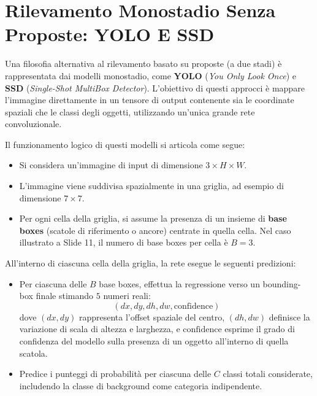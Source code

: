 ﻿\documentclass[11pt, a4paper]{article}
\begin{document}

\newpage

\section{Rilevamento Monostadio Senza Proposte: YOLO E SSD}

Una filosofia alternativa al rilevamento basato su proposte (a due stadi) è rappresentata dai modelli monostadio, come \textbf{YOLO} (\emph{You Only Look Once}) e \textbf{SSD} (\emph{Single-Shot MultiBox Detector}). L'obiettivo di questi approcci è mappare l'immagine direttamente in un tensore di output contenente sia le coordinate spaziali che le classi degli oggetti, utilizzando un'unica grande rete convoluzionale.

Il funzionamento logico di questi modelli si articola come segue:
\begin{itemize}
    \item Si considera un'immagine di input di dimensione $3 \times H \times W$.
    \item L'immagine viene suddivisa spazialmente in una griglia, ad esempio di dimensione $7 \times 7$.
    \item Per ogni cella della griglia, si assume la presenza di un insieme di \textbf{base boxes} (scatole di riferimento o ancore) centrate in quella cella. Nel caso illustrato a Slide 11, il numero di base boxes per cella è $B = 3$.
\end{itemize}

All'interno di ciascuna cella della griglia, la rete esegue le seguenti predizioni:
\begin{itemize}
    \item Per ciascuna delle $B$ base boxes, effettua la regressione verso un bounding-box finale stimando $5$ numeri reali:
    \[
    (dx, dy, dh, dw, \text{confidence})
    \]
    dove $(dx, dy)$ rappresenta l'offset spaziale del centro, $(dh, dw)$ definisce la variazione di scala di altezza e larghezza, e $\text{confidence}$ esprime il grado di confidenza del modello sulla presenza di un oggetto all'interno di quella scatola.
    \item Predice i punteggi di probabilità per ciascuna delle $C$ classi totali considerate, includendo la classe di background come categoria indipendente.
\end{itemize}
\end{document}
